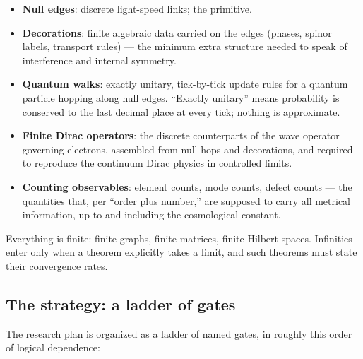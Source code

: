 \documentclass[11pt]{article}
\begin{document}
\begin{itemize}
\item \textbf{Null edges}: discrete light-speed links; the primitive.
\item \textbf{Decorations}: finite algebraic data carried on the edges
  (phases, spinor labels, transport rules) --- the minimum extra structure
  needed to speak of interference and internal symmetry.
\item \textbf{Quantum walks}: exactly unitary, tick-by-tick update rules
  for a quantum particle hopping along null edges.  ``Exactly unitary''
  means probability is conserved to the last decimal place at every tick;
  nothing is approximate.
\item \textbf{Finite Dirac operators}: the discrete counterparts of the
  wave operator governing electrons, assembled from null hops and
  decorations, and required to reproduce the continuum Dirac physics in
  controlled limits.
\item \textbf{Counting observables}: element counts, mode counts, defect
  counts --- the quantities that, per ``order plus number,'' are supposed
  to carry all metrical information, up to and including the cosmological
  constant.
\end{itemize}

Everything is finite: finite graphs, finite matrices, finite Hilbert
spaces.  Infinities enter only when a theorem explicitly takes a limit,
and such theorems must state their convergence rates.

\subsection{The strategy: a ladder of gates}

The research plan is organized as a ladder of named gates, in roughly this
order of logical dependence:
\end{document}
